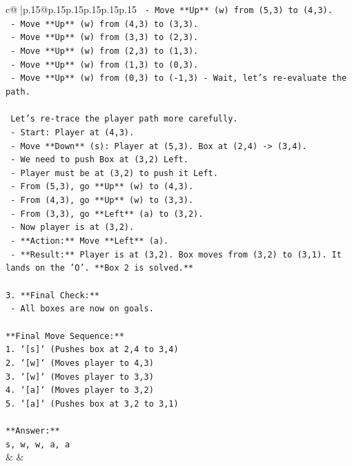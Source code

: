 \documentclass{article}
\begin{document}
{\begin{supertabular}{c@{$\;$}|p{.15\linewidth}@{}p{.15\linewidth}p{.15\linewidth}p{.15\linewidth}p{.15\linewidth}p{.15\linewidth}}
{{{\texttt{    {-} Move **Up** (w) from (5,3) to (4,3).} \\
\texttt{    {-} Move **Up** (w) from (4,3) to (3,3).} \\
\texttt{    {-} Move **Up** (w) from (3,3) to (2,3).} \\
\texttt{    {-} Move **Up** (w) from (2,3) to (1,3).} \\
\texttt{    {-} Move **Up** (w) from (1,3) to (0,3).} \\
\texttt{    {-} Move **Up** (w) from (0,3) to ({-}1,3) {-} Wait, let's re{-}evaluate the path.} \\
\\ 
\texttt{    Let's re{-}trace the player path more carefully.} \\
\texttt{    {-} Start: Player at (4,3).} \\
\texttt{    {-} Move **Down** (s): Player at (5,3). Box at (2,4) {-}> (3,4).} \\
\texttt{    {-} We need to push Box at (3,2) Left.} \\
\texttt{    {-} Player must be at (3,2) to push it Left.} \\
\texttt{    {-} From (5,3), go **Up** (w) to (4,3).} \\
\texttt{    {-} From (4,3), go **Up** (w) to (3,3).} \\
\texttt{    {-} From (3,3), go **Left** (a) to (3,2).} \\
\texttt{    {-} Now player is at (3,2).} \\
\texttt{    {-} **Action:** Move **Left** (a).} \\
\texttt{    {-} **Result:** Player is at (3,2). Box moves from (3,2) to (3,1). It lands on the 'O'. **Box 2 is solved.**} \\
\\ 
\texttt{3.  **Final Check:**} \\
\texttt{    {-} All boxes are now on goals.} \\
\\ 
\texttt{**Final Move Sequence:**} \\
\texttt{1.  `{[}s{]}` (Pushes box at 2,4 to 3,4)} \\
\texttt{2.  `{[}w{]}` (Moves player to 4,3)} \\
\texttt{3.  `{[}w{]}` (Moves player to 3,3)} \\
\texttt{4.  `{[}a{]}` (Moves player to 3,2)} \\
\texttt{5.  `{[}a{]}` (Pushes box at 3,2 to 3,1)} \\
\\ 
\texttt{**Answer:**} \\
\texttt{s, w, w, a, a} \\
            }
        }
    }
    & & \\ \\


\end{supertabular}}
\end{document}
